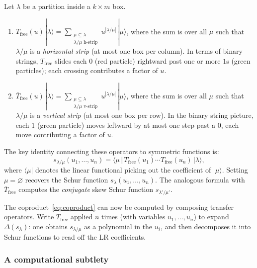 \begin{definition}
Let $\lambda$ be a partition inside a $k \times m$ box.
\begin{enumerate}
\item $T_{\mathrm{free}}(u)\,|\lambda\rangle = \displaystyle\sum_{\substack{\mu
\subseteq \lambda \\ \lambda/\mu \text{ h-strip}}} u^{|\lambda/\mu|}
\,|\mu\rangle$, where the sum is over all $\mu$ such that
$\lambda/\mu$ is a \emph{horizontal strip} (at most one box per
column).  In terms of binary strings, $T_{\mathrm{free}}$ slides each
$0$ (red particle) rightward past one or more $1$s (green particles);
each crossing contributes a factor of $u$.

\item $\bar{T}_{\mathrm{free}}(u)\,|\lambda\rangle =
\displaystyle\sum_{\substack{\mu \subseteq \lambda \\ \lambda/\mu
\text{ v-strip}}} u^{|\lambda/\mu|}\, |\mu\rangle$, where the sum is
over all $\mu$ such that $\lambda/\mu$ is a \emph{vertical strip} (at
most one box per row).  In the binary string picture, each $1$ (green
particle) moves leftward by at most one step past a $0$, each move
contributing a factor of $u$.
\end{enumerate}
\end{definition}

The key identity connecting these operators to symmetric functions is:
\begin{equation}
\label{eq:schur-transfer}
  s_{\lambda/\mu}(u_1, \ldots, u_n)
  = \langle \mu \,|\, T_{\mathrm{free}}(u_1) \cdots
    T_{\mathrm{free}}(u_n)\, |\lambda\rangle,
\end{equation}
where $\langle\mu|$ denotes the linear functional picking out the
coefficient of $|\mu\rangle$.  Setting $\mu = \varnothing$ recovers
the Schur function $s_\lambda(u_1, \ldots, u_n)$.  The analogous
formula with $\bar{T}_{\mathrm{free}}$ computes the \emph{conjugate}
skew Schur function $s_{\lambda'/\mu'}$.

The coproduct~\eqref{eq:coproduct} can now be computed by composing
transfer operators.  Write $T_{\mathrm{free}}$ applied $n$ times (with
variables $u_1, \ldots, u_n$) to expand
$\Delta(s_\lambda)$: one obtains $s_{\lambda/\mu}$ as a polynomial in
the $u_i$, and then decomposes it into Schur functions to read off the
LR coefficients.

\subsubsection*{A computational subtlety}

